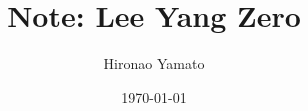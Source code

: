 \documentclass[aps, 12pt]{revtex4-2}
\begin{document}
\title{Note: Lee Yang Zero}
\author{Hironao Yamato}
\date{\today}
\maketitle

\section{}


\end{document}

